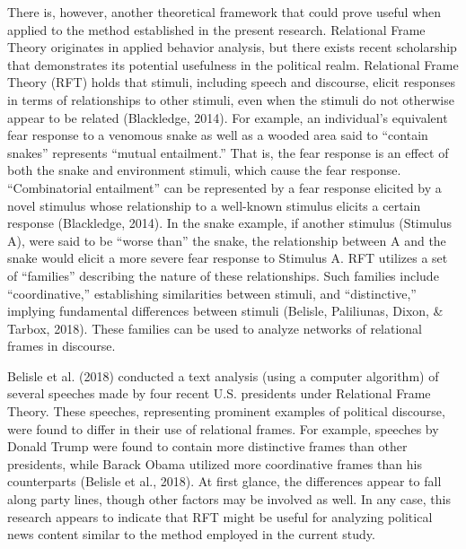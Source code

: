 \documentclass[english,,man]{apa6}
\begin{document}
There is, however, another theoretical framework that could prove useful when applied to the method established in the present research. Relational Frame Theory originates in applied behavior analysis, but there exists recent scholarship that demonstrates its potential usefulness in the political realm. Relational Frame Theory (RFT) holds that stimuli, including speech and discourse, elicit responses in terms of relationships to other stimuli, even when the stimuli do not otherwise appear to be related (Blackledge, 2014). For example, an individual's equivalent fear response to a venomous snake as well as a wooded area said to \enquote{contain snakes} represents \enquote{mutual entailment.} That is, the fear response is an effect of both the snake and environment stimuli, which cause the fear response. \enquote{Combinatorial entailment} can be represented by a fear response elicited by a novel stimulus whose relationship to a well-known stimulus elicits a certain response (Blackledge, 2014). In the snake example, if another stimulus (Stimulus A), were said to be \enquote{worse than} the snake, the relationship between A and the snake would elicit a more severe fear response to Stimulus A. RFT utilizes a set of \enquote{families} describing the nature of these relationships. Such families include \enquote{coordinative,} establishing similarities between stimuli, and \enquote{distinctive,} implying fundamental differences between stimuli (Belisle, Paliliunas, Dixon, \& Tarbox, 2018). These families can be used to analyze networks of relational frames in discourse.

Belisle et al. (2018) conducted a text analysis (using a computer algorithm) of several speeches made by four recent U.S. presidents under Relational Frame Theory. These speeches, representing prominent examples of political discourse, were found to differ in their use of relational frames. For example, speeches by Donald Trump were found to contain more distinctive frames than other presidents, while Barack Obama utilized more coordinative frames than his counterparts (Belisle et al., 2018). At first glance, the differences appear to fall along party lines, though other factors may be involved as well. In any case, this research appears to indicate that RFT might be useful for analyzing political news content similar to the method employed in the current study.
\end{document}
